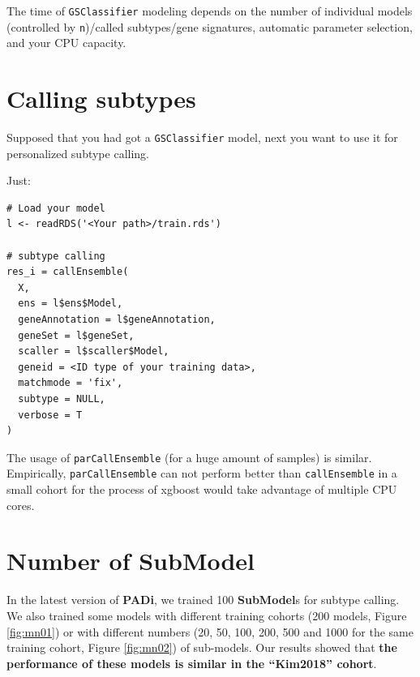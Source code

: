 \documentclass[
  12pt,
]{book}
\newcommand{\passthrough}[1]{#1}
\begin{document}
The time of \passthrough{\lstinline!GSClassifier!} modeling depends on the number of individual models (controlled by \passthrough{\lstinline!n!})/called subtypes/gene signatures, automatic parameter selection, and your CPU capacity.

\hypertarget{calling-subtypes}{%
\section{Calling subtypes}\label{calling-subtypes}}

Supposed that you had got a \passthrough{\lstinline!GSClassifier!} model, next you want to use it for personalized subtype calling.

Just:

\begin{lstlisting}
# Load your model
l <- readRDS('<Your path>/train.rds')

# subtype calling
res_i = callEnsemble(
  X,
  ens = l$ens$Model,
  geneAnnotation = l$geneAnnotation,
  geneSet = l$geneSet,
  scaller = l$scaller$Model,
  geneid = <ID type of your training data>,
  matchmode = 'fix',
  subtype = NULL,
  verbose = T
)
\end{lstlisting}

The usage of \passthrough{\lstinline!parCallEnsemble!} (for a huge amount of samples) is similar. Empirically, \passthrough{\lstinline!parCallEnsemble!} can not perform better than \passthrough{\lstinline!callEnsemble!} in a small cohort for the process of xgboost would take advantage of multiple CPU cores.

\hypertarget{topicSubmodel}{%
\section{Number of SubModel}\label{topicSubmodel}}

In the latest version of \textbf{PADi}, we trained 100 \textbf{SubModel}s for subtype calling. We also trained some models with different training cohorts (200 models, Figure \ref{fig:mn01}) or with different numbers (20, 50, 100, 200, 500 and 1000 for the same training cohort, Figure \ref{fig:mn02}) of sub-models. Our results showed that \textbf{the performance of these models is similar in the ``Kim2018'' cohort}.
\end{document}
